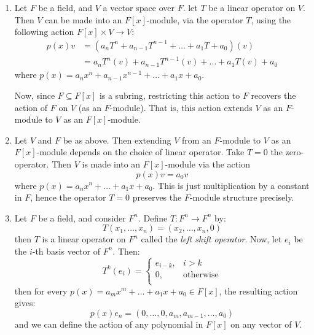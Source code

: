 \begin{example}\label{example_9.3}
  \begin{enumerate}
    \item[(1)] Let $F$ be a field, and $V$ a vector space over $F$.
      let $T$ be a linear operator on $V$. Then $V$ can be made into an
      $F[x]$-module, via the operator $T$, using the following action
      $F[x] \times V \xrightarrow{} V$:
      \begin{align*}
        p(x)v &=  (a_nT^n+a_{n-1}T^{n-1}+\dots+a_1T+a_0)(v) \\
              &=  a_nT^n(v)+a_{n-1}T^{n-1}(v)+\dots+a_1T(v)+a_0
      \end{align*}
      where $p(x)=a_nx^n+a_{n-1}x^{n-1}+\dots+a_1x+a_0$.

      Now, since $F \subseteq F[x]$ is a subring, restricting this
      action to $F$ recovers the action of $F$ on $V$ (as an
      $F$-module). That is, this action extends $V$ as an $F$-module
      to $V$ as an $F[x]$-module.

    \item[(2)] Let $V$ and $F$ be as above. Then extending $V$ from
      an  $F$-module to $V$ as an $F[x]$-module depends on the
      choice of linear operator. Take $T=0$ the zero-operator. Then
       $V$ is made into an $F[x]$-module via the action
       \begin{equation*}
         p(x)v=a_0v
       \end{equation*}
       where $p(x)=a_nx^n+\dots+a_1x+a_0$. This is just
       multiplication by a constant in $F$, hence the operator
       $T=0$ preserves the $F$-module structure precisely.

     \item[(3)] Let $F$ be a field, and consider $F^n$. Define
       $T:F^n \xrightarrow{} F^n$ by:
       \begin{equation*}
         T(x_1, \dots, x_n)=(x_2, \dots, x_n, 0)
       \end{equation*}
       then $T$ is a linear operator on $F^n$ called the
       \textit{left shift operator}. Now, let $e_i$ be the $i$-th
       basis vector of $F^n$. Then:
       \begin{equation*}
         T^k(e_i)=
         \begin{cases}
           e_{i-k}, & i>k \\
           0, & \text{otherwise} \\
         \end{cases}
       \end{equation*}
       then for every $p(x)=a_mx^m+\dots+a_1x+a_0 \in F[x]$, the
       resulting action gives:
       \begin{equation*}
         p(x)e_n=(0, \dots, 0, a_m, a_{m-1}, \dots, a_0)
       \end{equation*}
       and we can define the action of any polynomial in $F[x]$ on
       any vector of  $V$.
  \end{enumerate}
\end{example}

